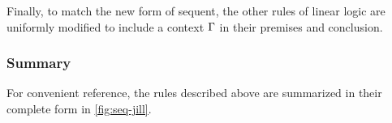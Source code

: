 Finally, 
to match the new form of sequent,
the other rules of linear logic are uniformly modified to include a context $\Gamma$ in their premises and conclusion.


\subsubsection{Summary}\label{sec:summary-linear-logic}

For convenient reference, the rules described above are summarized in their complete form in \cref{fig:seq-jill}.%




